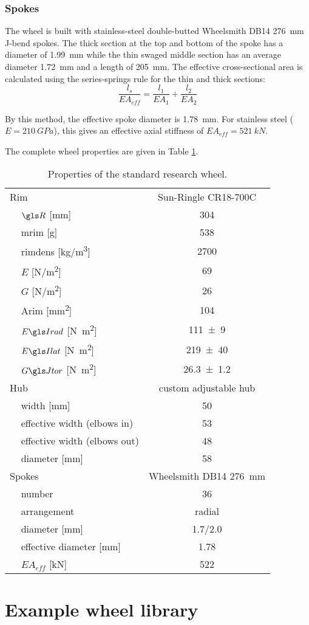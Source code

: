 \documentclass[../../thesis.tex]{subfiles}
\begin{document}
\subsubsection*{Spokes}
The wheel is built with stainless-steel double-butted Wheelsmith DB14 \SI{276}{mm} J-bend spokes. The thick section at the top and bottom of the spoke has a diameter of \SI{1.99}{mm} while the thin swaged middle section has an average diameter \SI{1.72}{mm} and a length of \SI{205}{mm}. The effective cross-sectional area is calculated using the series-springs rule for the thin and thick sections:
\begin{equation}
\frac{l_s}{EA_{eff}} = \frac{l_1}{EA_1} + \frac{l_2}{EA_2}
\end{equation}

By this method, the effective spoke diameter is \SI{1.78}{mm}. For stainless steel ($E = \SI{210}{GPa}$), this gives an effective axial stiffness of $EA_{eff} = \SI{521}{kN}$.

The complete wheel properties are given in Table \ref{tab:std_research_wheel}.

\begin{table}
\caption{Properties of the standard research wheel.}
\label{tab:std_research_wheel}
\begin{tabular}{llc}
\hline
\multicolumn{2}{l}{Rim}& Sun-Ringle CR18-700C\\
\,& $\R$ [\si{mm}]         & \num{304}\\
\,& \gls{mrim} [\si{g}]    & \num{538}\\
\,& \gls{rimdens} [\si{kg/m^3}] & \num{2700}\\
\,& $E$ [\si{N/m^2}]       & \num{69}\\
\,& $G$ [\si{N/m^2}]       & \num{26}\\
\,& \gls{Arim} [\si{mm^2}] & \num{104}\\
\,& $\EIr$ [\si{N.m^2}]    & \num{111+-9}\\
\,& $\EIl$ [\si{N.m^2}]    & \num{219+-40}\\
\,& $\GJ$   [\si{N.m^2}]   & \num{26.3+-1.2}\\
\multicolumn{2}{l}{Hub}    & custom adjustable hub\\
\,& width [\si{mm}]        & 50\\
\,& effective width (elbows in) & 53\\
\,& effective width (elbows out) & 48\\
\,& diameter [\si{mm}]     & 58\\
\multicolumn{2}{l}{Spokes} & Wheelsmith DB14 \SI{276}{mm}\\
\,& number                 & 36\\
\,& arrangement            & radial\\
\,& diameter [\si{mm}]     & 1.7/2.0\\
\,& effective diameter [\si{mm}] & 1.78\\
\,& $EA_{eff}$ [\si{kN}]   & 522\\
\hline
\end{tabular}
\end{table}

\section{Example wheel library}
\end{document}
